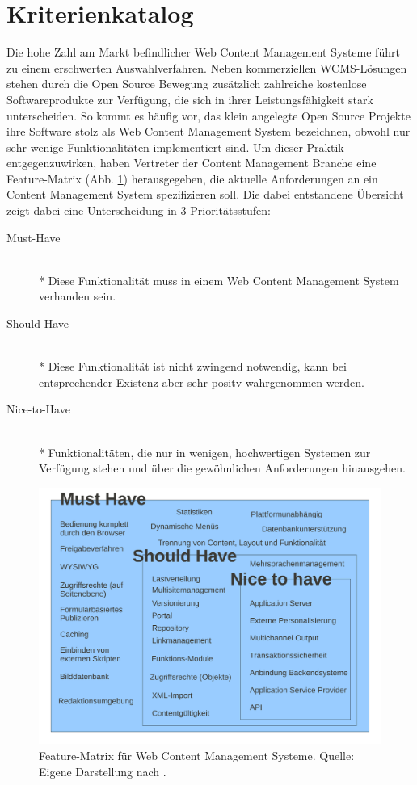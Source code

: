 \section{Kriterienkatalog}
Die hohe Zahl am Markt befindlicher Web Content Management Systeme führt zu einem erschwerten Auswahlverfahren. Neben kommerziellen WCMS-Lösungen stehen durch die Open Source Bewegung zusätzlich zahlreiche kostenlose Softwareprodukte zur Verfügung, die sich in ihrer Leistungsfähigkeit stark unterscheiden. So kommt es häufig vor, das klein angelegte Open Source Projekte ihre Software stolz als Web Content Management System bezeichnen, obwohl nur sehr wenige Funktionalitäten implementiert sind. Um dieser Praktik entgegenzuwirken, haben Vertreter der Content Management Branche eine Feature-Matrix (Abb. \ref{featurematrix}) herausgegeben, die aktuelle Anforderungen an ein Content Management System spezifizieren soll. Die dabei entstandene Übersicht zeigt dabei eine Unterscheidung in 3 Prioritätsstufen:
\begin{description}
\item[Must-Have]\mbox{~}\\*
Diese Funktionalität muss in einem Web Content Management System verhanden sein.
\item[Should-Have]\mbox{~}\\*
Diese Funktionalität ist nicht zwingend notwendig, kann bei entsprechender Existenz aber sehr positv wahrgenommen werden.
\item[Nice-to-Have]\mbox{~}\\*
Funktionalitäten, die nur in wenigen, hochwertigen Systemen zur Verfügung stehen und über die gewöhnlichen Anforderungen hinausgehen.
\end{description}


\begin{figure}[!h]
\begin{center}
\includegraphics[scale=0.5]{images/analyse/featurematrix.pdf}
\caption[Feature-Matrix für Web Content Management Systeme]{Feature-Matrix für Web Content Management Systeme. Quelle: Eigene Darstellung nach \citep{jdkmatrix}.}
\label{featurematrix}
\end{center}
\end{figure}

